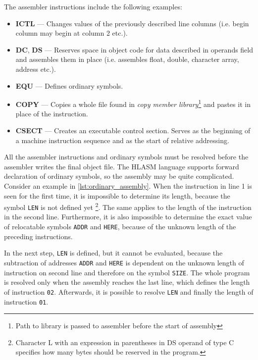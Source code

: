 The assembler instructions include the following examples:
\begin{itemize}
	\item \textbf{ICTL} --- Changes values of the previously described line columns (i.e. begin column may begin at column 2 etc.).
	
	\item \textbf{DC}, \textbf{DS} --- Reserves space in object code for data described in operands field and assembles them in place (i.e. assembles float, double, character array, address etc.).
	
	\item \textbf{EQU} --- Defines ordinary symbols.
	
	\item \textbf{COPY} --- Copies a whole file found in \emph{copy member library}\footnote{Path to library is passed to assembler before the start of assembly} and pastes it in place of the instruction.
	
	\item \textbf{CSECT} --- Creates an executable control section. Serves as the beginning of a machine instruction sequence and as the start of relative addressing.
\end{itemize}

\vspace{5mm}

All the assembler instructions and ordinary symbols must be resolved before the assembler writes the final object file. The HLASM language supports forward declaration of ordinary symbols, so the assembly may be quite complicated. Consider an example in \cref{lst:ordinary_assembly}. When the instruction in line 1 is seen for the first time, it is impossible to determine its length, because the symbol \verb|LEN| is not defined yet \footnote{Character L with an expression in parentheses in DS operand of type C specifies how many bytes should be reserved in the program.}. The same applies to the length of the instruction in the second line. Furthermore, it is also impossible to determine the exact value of relocatable symbols \verb|ADDR| and \verb|HERE|, because of the unknown length of the preceding instructions.

In the next step, \verb|LEN| is defined, but it cannot be evaluated, because the subtraction of addresses \verb|ADDR| and \verb|HERE| is dependent on the unknown length of instruction on second line and therefore on the symbol \verb|SIZE|. The whole program is resolved only when the assembly reaches the last line, which defines the length of instruction \verb|02|. Afterwards, it is possible to resolve \verb|LEN| and finally the length of instruction \verb|01|.

